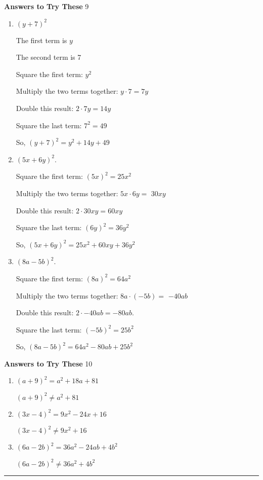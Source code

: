 \documentclass[a4paper]{JAC2003}
\begin{document}
\noindent\textcolor{red!75!black}{\textbf{Answers to Try These}} 9
\begin{enumerate}
\item $(y+7)^{2}$

The first term is $y$

The second term is 7

Square the first term: $y^{2}$

Multiply the two terms together: $y \cdot 7=7 y$

Double this result: $2 \cdot 7 y=14 y$

Square the last term: $7^{2}=49$

So, $(y+7)^{2}=y^{2}+14 y+49$

\item $(5 x+6 y)^{2}$.

Square the first term: $(5 x)^{2}=25 x^{2}$

Multiply the two terms together: $5 x \cdot 6 y=$ $30 x y$

Double this result: $2 \cdot 30 x y=60 x y$

Square the last term: $(6 y)^{2}=36 y^{2}$

So, $(5 x+6 y)^{2}=25 x^{2}+60 x y+36 y^{2}$

\item $(8 a-5 b)^{2}$.

Square the first term: $(8 a)^{2}=64 a^{2}$

Multiply the two terms together: $8 a \cdot(-5 b)=$ $-40 a b$

Double this result: $2 \cdot-40 a b=-80 a b$.

Square the last term: $(-5 b)^{2}=25 b^{2}$

So, $(8 a-5 b)^{2}=64 a^{2}-80 a b+25 b^{2}$
\end{enumerate}

\noindent\textcolor{red!75!black}{\textbf{Answers to Try These}} 10
\begin{enumerate}
\item $(a+9)^{2}=a^{2}+18 a+81$

$(a+9)^{2} \neq a^{2}+81$

\item $(3 x-4)^{2}=9 x^{2}-24 x+16$

$(3 x-4)^{2} \neq 9 x^{2}+16$

\item $(6 a-2 b)^{2}=36 a^{2}-24 a b+4 b^{2}$

$(6 a-2 b)^{2} \neq 36 a^{2}+4 b^{2}$
\end{enumerate}
\noindent\rule[0.5ex]{\linewidth}{1pt}
\end{document}
